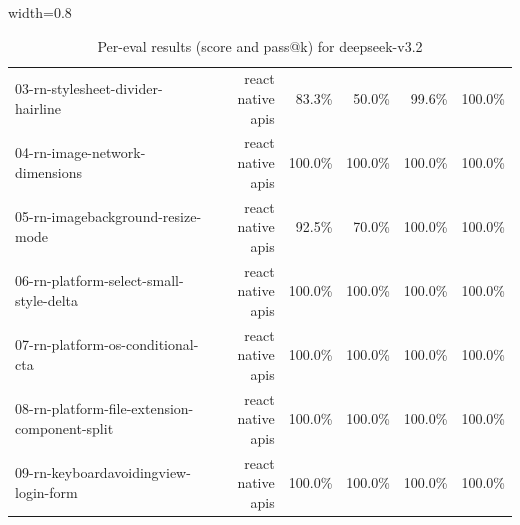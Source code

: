 \begin{table}[htbp]
\begin{adjustbox}{width=0.8\textwidth}
\begin{tabular}{lrrrrr}
03-rn-stylesheet-divider-hairline & react native apis & 83.3\% & 50.0\% & 99.6\% & 100.0\% \\
04-rn-image-network-dimensions & react native apis & 100.0\% & 100.0\% & 100.0\% & 100.0\% \\
05-rn-imagebackground-resize-mode & react native apis & 92.5\% & 70.0\% & 100.0\% & 100.0\% \\
06-rn-platform-select-small-style-delta & react native apis & 100.0\% & 100.0\% & 100.0\% & 100.0\% \\
07-rn-platform-os-conditional-cta & react native apis & 100.0\% & 100.0\% & 100.0\% & 100.0\% \\
08-rn-platform-file-extension-component-split & react native apis & 100.0\% & 100.0\% & 100.0\% & 100.0\% \\
09-rn-keyboardavoidingview-login-form & react native apis & 100.0\% & 100.0\% & 100.0\% & 100.0\% \\
\bottomrule
\end{tabular}
\end{adjustbox}
\caption{Per-eval results (score and pass@k) for deepseek-v3.2}
\end{table}
